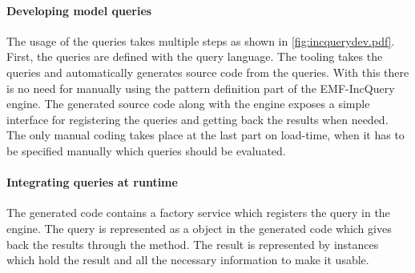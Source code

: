 \paragraph{Developing model queries}
The usage of the queries takes multiple steps as shown in \autoref{fig:incquerydev.pdf}.
First, the queries are defined with the query language. The tooling takes the queries 
and automatically generates source code from the queries. With this there is no need 
for manually using the pattern definition part of the EMF-IncQuery engine. The generated
source code along with the engine exposes a simple interface for registering the
queries and getting back the results when needed. The only manual coding takes place
at the last part on load-time, when it has to be specified manually which queries 
should be evaluated. 

\paragraph{Integrating queries at runtime}  
The generated code contains a factory service which registers the query in the
engine. The query is represented as a  object in the generated
code which gives back the results through the 
method. The result is represented by  instances which hold the result 
and all the necessary information to make it usable.


